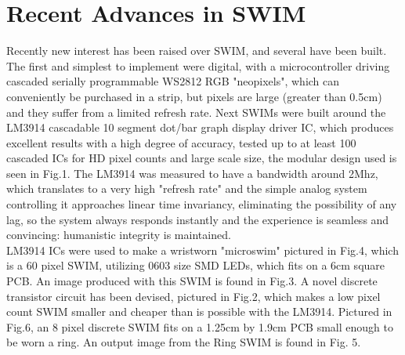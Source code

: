 \documentclass{sigchi-ext}
\begin{document}
\section{Recent Advances in SWIM}
Recently new interest has been raised over SWIM, and several have been built.
The first and simplest to implement were digital, with a microcontroller driving cascaded serially programmable WS2812 RGB "neopixels", which can conveniently be purchased in a strip, but pixels are large (greater than 0.5cm) and they suffer from a limited refresh rate. 
Next SWIMs were built around the LM3914 cascadable 10 segment dot/bar graph display driver IC, which produces excellent results with a high degree of accuracy, tested up to at least 100 cascaded ICs for HD pixel counts and large scale size, the modular design used is seen in Fig.1.
The LM3914 was measured to have a bandwidth around 2Mhz, which translates to a very high "refresh rate" and the simple analog system controlling it approaches linear time invariancy, eliminating the possibility of any lag, so the system always responds instantly and the experience is seamless and convincing: humanistic integrity is maintained.\\
LM3914 ICs were used to make a wristworn "microswim" pictured in Fig.4, which is a 60 pixel SWIM, utilizing 0603 size SMD LEDs, which fits on a 6cm square PCB. An image produced with this SWIM is found in Fig.3. 
A novel discrete transistor circuit has been devised, pictured in Fig.2, which makes a low pixel count SWIM smaller and cheaper than is possible with the LM3914. Pictured in Fig.6, an 8 pixel discrete SWIM fits on a 1.25cm by 1.9cm PCB small enough to be worn a ring. An output image from the Ring SWIM is found in Fig. 5.
%
\end{document}
